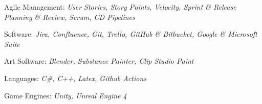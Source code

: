 


\begin{cvparagraph}
    
    \begin{cvitems}
        \text{}
        \item
        \item Agile Management: \textit{User Stories, Story Points, Velocity, Sprint \& Release Planning \& Review, Scrum, CD Pipelines}
        \item Software: \textit{Jira, Confluence, Git, Trello, GitHub \& Bitbucket, Google \& Microsoft Suite}
        \item Art Software: \textit{Blender, Substance Painter, Clip Studio Paint}
        \item Languages: \textit{C\#, C++, Latex, Github Actions}
        \item Game Engines: \textit{Unity, Unreal Engine 4}
    \end{cvitems}

\end{cvparagraph}